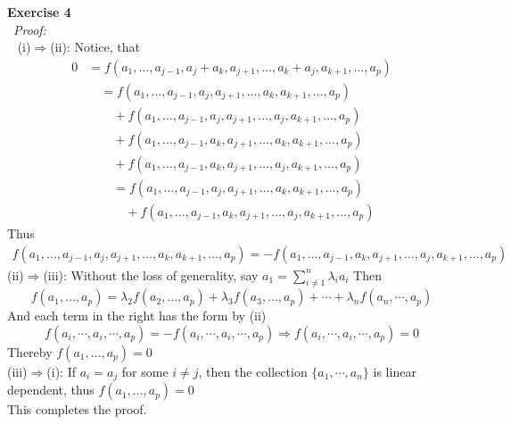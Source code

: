 \documentclass[12pt]{article}
\def\lam{\lambda}
\def\ep#1#2{{\bf Exercise #1}\\~{\it Proof:}\\~#2\\[1em]}
\newcommand{\eq}[1]{\begin{align*}#1\end{align*}}
\begin{document}
\ep{4}{
(i)$\Longrightarrow$(ii):
Notice, that
\eq{
0&=f(a_1,\ldots,a_{j-1},a_j+a_k,a_{j+1},\ldots,a_k+a_j,a_{k+1},\ldots,a_p)\\
&\quad=f(a_1,\ldots,a_{j-1},a_j,a_{j+1},\ldots,a_k,a_{k+1},\ldots,a_p)\\
&\qquad+f(a_1,\ldots,a_{j-1},a_j,a_{j+1},\ldots,a_j,a_{k+1},\ldots,a_p)\\
&\qquad+f(a_1,\ldots,a_{j-1},a_k,a_{j+1},\ldots,a_k,a_{k+1},\ldots,a_p)\\
&\qquad+f(a_1,\ldots,a_{j-1},a_k,a_{j+1},\ldots,a_j,a_{k+1},\ldots,a_p)\\
&\qquad=f(a_1,\ldots,a_{j-1},a_j,a_{j+1},\ldots,a_k,a_{k+1},\ldots,a_p)\\
&\quad\qquad+f(a_1,\ldots,a_{j-1},a_k,a_{j+1},\ldots,a_j,a_{k+1},\ldots,a_p)
}
Thus 
\eq{
f(a_1,\ldots,a_{j-1},a_j,a_{j+1},\ldots,a_k,a_{k+1},\ldots,a_p)=-f(a_1,\ldots,a_{j-1},a_k,a_{j+1},\ldots,a_j,a_{k+1},\ldots,a_p)
}
(ii)$\Longrightarrow$(iii):
Without the loss of generality, say $a_1=\sum_{i\neq1}^{n}\lam_ia_i$
Then 
\[
f(a_1,\ldots,a_p)=\lam_2f(a_2,\ldots,a_p)+\lam_3f(a_3,\ldots,a_p)+\cdots+\lam_nf(a_n,\cdots,a_p)
\]
And each term in the right has the form by (ii)
\[
f(a_i,\cdots,a_i,\cdots,a_p)=-f(a_i,\cdots,a_i,\cdots,a_p)\Longrightarrow f(a_i,\cdots,a_i,\cdots,a_p)=0
\]
Thereby $f(a_1,\ldots,a_p)=0$\\
(iii)$\Longrightarrow$(i): If $a_i=a_j$ for some $i\neq j$, then the collection $\{a_1,\cdots,a_n\}$ is linear dependent, thus $f(a_1,\ldots,a_p)=0$\\
This completes the proof.
}
\end{document}
